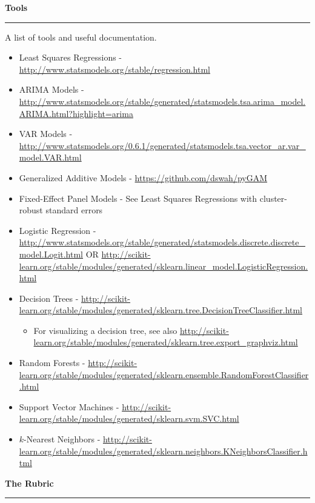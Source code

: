 \documentclass{article}
\begin{document}
\vspace*{2em}
\noindent \Large \textbf{Tools}\\[-.8em]\hrule \vspace*{.5em}
\large \noindent A list of tools and useful documentation.\vspace*{.5em}

\begin{itemize}

\item Least Squares Regressions - \url{http://www.statsmodels.org/stable/regression.html}
\item ARIMA Models - \url{http://www.statsmodels.org/stable/generated/statsmodels.tsa.arima_model.ARIMA.html?highlight=arima}
\item VAR Models - \url{http://www.statsmodels.org/0.6.1/generated/statsmodels.tsa.vector_ar.var_model.VAR.html}
\item Generalized Additive Models - \url{https://github.com/dswah/pyGAM}
\item Fixed-Effect Panel Models - See Least Squares Regressions with cluster-robust standard errors
\item Logistic Regression - \url{http://www.statsmodels.org/stable/generated/statsmodels.discrete.discrete_model.Logit.html} OR \url{http://scikit-learn.org/stable/modules/generated/sklearn.linear_model.LogisticRegression.html}
\item Decision Trees - \url{http://scikit-learn.org/stable/modules/generated/sklearn.tree.DecisionTreeClassifier.html}
\begin{itemize}
\item For visualizing a decision tree, see also \url{http://scikit-learn.org/stable/modules/generated/sklearn.tree.export_graphviz.html}
\end{itemize}
\item Random Forests - \url{http://scikit-learn.org/stable/modules/generated/sklearn.ensemble.RandomForestClassifier.html}
\item Support Vector Machines - \url{http://scikit-learn.org/stable/modules/generated/sklearn.svm.SVC.html}
\item $k$-Nearest Neighbors - \url{http://scikit-learn.org/stable/modules/generated/sklearn.neighbors.KNeighborsClassifier.html}

\end{itemize}

\clearpage

\noindent \Large \textbf{The Rubric}\\[-.8em]\hrule \vspace*{.5em}
\end{document}
